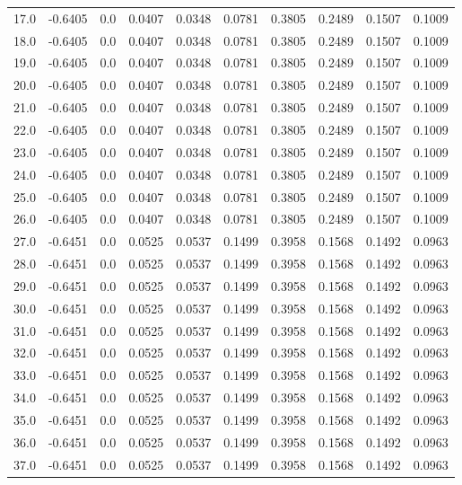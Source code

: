 \begin{longtable}{lrrrrrrrrr}
17.0 & -0.6405 & 0.0 & 0.0407 & 0.0348 & 0.0781 & 0.3805 & 0.2489 & 0.1507 & 0.1009 \\
18.0 & -0.6405 & 0.0 & 0.0407 & 0.0348 & 0.0781 & 0.3805 & 0.2489 & 0.1507 & 0.1009 \\
19.0 & -0.6405 & 0.0 & 0.0407 & 0.0348 & 0.0781 & 0.3805 & 0.2489 & 0.1507 & 0.1009 \\
20.0 & -0.6405 & 0.0 & 0.0407 & 0.0348 & 0.0781 & 0.3805 & 0.2489 & 0.1507 & 0.1009 \\
21.0 & -0.6405 & 0.0 & 0.0407 & 0.0348 & 0.0781 & 0.3805 & 0.2489 & 0.1507 & 0.1009 \\
22.0 & -0.6405 & 0.0 & 0.0407 & 0.0348 & 0.0781 & 0.3805 & 0.2489 & 0.1507 & 0.1009 \\
23.0 & -0.6405 & 0.0 & 0.0407 & 0.0348 & 0.0781 & 0.3805 & 0.2489 & 0.1507 & 0.1009 \\
24.0 & -0.6405 & 0.0 & 0.0407 & 0.0348 & 0.0781 & 0.3805 & 0.2489 & 0.1507 & 0.1009 \\
25.0 & -0.6405 & 0.0 & 0.0407 & 0.0348 & 0.0781 & 0.3805 & 0.2489 & 0.1507 & 0.1009 \\
26.0 & -0.6405 & 0.0 & 0.0407 & 0.0348 & 0.0781 & 0.3805 & 0.2489 & 0.1507 & 0.1009 \\
27.0 & -0.6451 & 0.0 & 0.0525 & 0.0537 & 0.1499 & 0.3958 & 0.1568 & 0.1492 & 0.0963 \\
28.0 & -0.6451 & 0.0 & 0.0525 & 0.0537 & 0.1499 & 0.3958 & 0.1568 & 0.1492 & 0.0963 \\
29.0 & -0.6451 & 0.0 & 0.0525 & 0.0537 & 0.1499 & 0.3958 & 0.1568 & 0.1492 & 0.0963 \\
30.0 & -0.6451 & 0.0 & 0.0525 & 0.0537 & 0.1499 & 0.3958 & 0.1568 & 0.1492 & 0.0963 \\
31.0 & -0.6451 & 0.0 & 0.0525 & 0.0537 & 0.1499 & 0.3958 & 0.1568 & 0.1492 & 0.0963 \\
32.0 & -0.6451 & 0.0 & 0.0525 & 0.0537 & 0.1499 & 0.3958 & 0.1568 & 0.1492 & 0.0963 \\
33.0 & -0.6451 & 0.0 & 0.0525 & 0.0537 & 0.1499 & 0.3958 & 0.1568 & 0.1492 & 0.0963 \\
34.0 & -0.6451 & 0.0 & 0.0525 & 0.0537 & 0.1499 & 0.3958 & 0.1568 & 0.1492 & 0.0963 \\
35.0 & -0.6451 & 0.0 & 0.0525 & 0.0537 & 0.1499 & 0.3958 & 0.1568 & 0.1492 & 0.0963 \\
36.0 & -0.6451 & 0.0 & 0.0525 & 0.0537 & 0.1499 & 0.3958 & 0.1568 & 0.1492 & 0.0963 \\
37.0 & -0.6451 & 0.0 & 0.0525 & 0.0537 & 0.1499 & 0.3958 & 0.1568 & 0.1492 & 0.0963 \\

\end{longtable}
